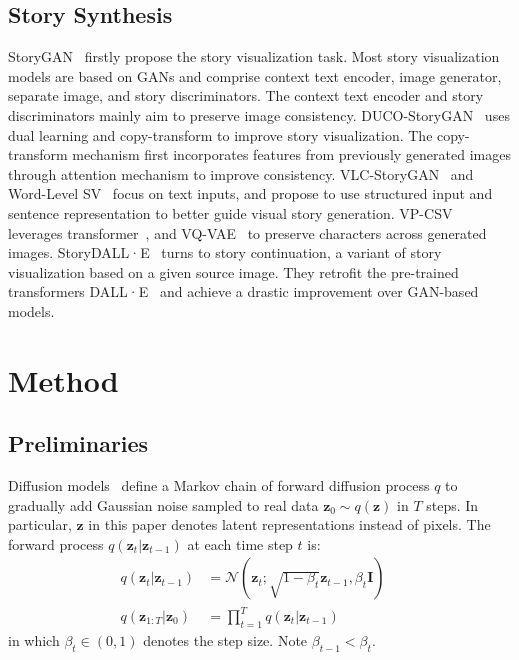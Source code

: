 \documentclass[10pt,twocolumn,letterpaper]{article}
\begin{document}
\subsection{Story Synthesis}
StoryGAN~\cite{storygan} firstly propose the story visualization task. Most story visualization models are based on GANs and comprise context text encoder, image generator, separate image, and story discriminators. The context text encoder and story discriminators mainly aim to preserve image consistency. DUCO-StoryGAN~\cite{ducostorygan} uses dual learning and copy-transform to improve story visualization. The copy-transform mechanism first incorporates features from previously generated images through attention mechanism to improve consistency. VLC-StoryGAN~\cite{vlcstorygan} and Word-Level SV~\cite{wordlevelsv} focus on text inputs, and propose to use structured input and sentence representation to better guide visual story generation. VP-CSV~\cite{vpcsv} leverages transformer~\cite{transformer}, and VQ-VAE~\cite{vqvae} to preserve characters across generated images. StoryDALL·E~\cite{storydalle} turns to story continuation, a variant of story visualization based on a given source image. They retrofit the pre-trained transformers DALL·E~\cite{dalle} and achieve a drastic improvement over GAN-based models.

\section{Method}
\subsection{Preliminaries}
Diffusion models~\cite{diffusionmodel} define a Markov chain of forward diffusion process $q$ to gradually add Gaussian noise sampled to real data $\mathbf{z}_0 \sim q(\mathbf{z})$ in $T$ steps. In particular, $\mathbf{z}$ in this paper denotes latent representations instead of pixels. The forward process $q(\mathbf{z}_t \vert \mathbf{z}_{t-1})$ at each time step $t$ is:
\begin{equation}
\begin{aligned}
    q(\mathbf{z}_t \vert \mathbf{z}_{t-1}) &= \mathcal{N}(\mathbf{z}_t; \sqrt{1 - \beta_t} \mathbf{z}_{t-1}, \beta_t\mathbf{I}) \quad\\
    q(\mathbf{z}_{1:T} \vert \mathbf{z}_0) &= \prod^T_{t=1} q(\mathbf{z}_t \vert \mathbf{z}_{t-1})
\end{aligned}
\end{equation}
in which $\beta_t \in (0, 1)$ denotes the step size. Note $\beta_{t-1} < \beta_t$.
\end{document}
